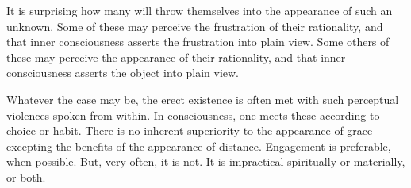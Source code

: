 

It is surprising how many will throw themselves into the appearance of
such an unknown.  Some of these may perceive the frustration of their
rationality, and that inner consciousness asserts the frustration into
plain view.  Some others of these may perceive the appearance of their
rationality, and that inner consciousness asserts the object into
plain view.  

Whatever the case may be, the erect existence is often met with such
perceptual violences spoken from within.  In consciousness, one meets
these according to choice or habit.  There is no inherent superiority
to the appearance of grace excepting the benefits of the appearance of
distance.  Engagement is preferable, when possible.  But, very often,
it is not.  It is impractical spiritually or materially, or both.

\bye
